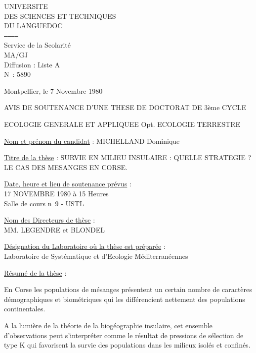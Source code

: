 

UNIVERSITE\\
DES SCIENCES ET TECHNIQUES\\
DU LANGUEDOC\\
\texttt{------------}\\
Service de la Scolarité\\
MA/GJ\\
Diffusion : Liste A\\
N\textdegree\ : 5890

Montpellier, le 7 Novembre 1980

AVIS DE SOUTENANCE D'UNE THESE DE DOCTORAT DE 3ème CYCLE

ECOLOGIE GENERALE ET APPLIQUEE Opt. ECOLOGIE TERRESTRE


\uline{Nom et prénom du candidat} : MICHELLAND Dominique

\uline{Titre de la thèse} : SURVIE EN MILIEU INSULAIRE : QUELLE STRATEGIE ? LE CAS DES MESANGES EN CORSE.

\uline{Date, heure et lieu de soutenance prévus} :\\
17 NOVEMBRE 1980 à 15 Heures\\
Salle de cours n\textdegree\ 9 - USTL

\uline{Nom des Directeurs de thèse} :\\
MM. LEGENDRE et BLONDEL

\uline{Désignation du Laboratoire où la thèse est préparée} :\\
Laboratoire de Systématique et d'Ecologie Méditerranéennes

\uline{Résumé de la thèse} :

En Corse les populations de mésanges présentent un certain nombre de caractères démographiques et biométriques qui les différencient nettement des populations continentales.

A la lumière de la théorie de la biogéographie insulaire, cet ensemble d'observations peut s'interpréter comme le résultat de pressions de sélection de type K qui favorisent la survie des populations dans les milieux isolés et confinés.

